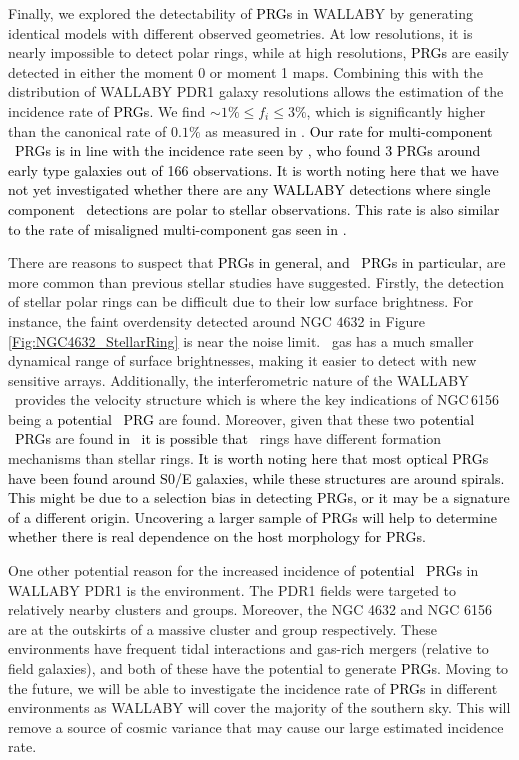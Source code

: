 \documentclass[fleqn,usenatbib]{mnras}
\newcommand{\hi}{\text{H\,\sc{i}}}
\begin{document}
Finally, we explored the detectability of \textcolor{black}{PRGs} in WALLABY by generating identical models with different observed geometries.  At low resolutions, it is nearly impossible to detect polar rings, while at high resolutions, \textcolor{black}{PRGs} are easily detected in either the moment 0 or moment 1 maps.  Combining this with the distribution of WALLABY PDR1 galaxy resolutions allows the estimation of the incidence rate of \textcolor{black}{PRGs}.  We find $\sim 1\% \le f_{i} \le 3 \%$, which is significantly higher than the canonical rate of $0.1\%$ as measured in \citet{Reshetnikov2011}.  \textcolor{black}{Our rate for multi-component \hi\ PRGs is in line with the incidence rate seen by \citet{Serra2012}, who found 3 PRGs around early type galaxies out of 166 observations.  It is worth noting here that we have not yet investigated whether there are any WALLABY detections where single component \hi\ detections are polar to stellar observations.  This rate is also similar to the rate of misaligned multi-component gas seen in \citet{Cao2022}.}

There are reasons to suspect that \textcolor{black}{PRGs} \textcolor{black}{in general, and \hi\ PRGs in particular,} are more common than previous stellar studies have suggested.  Firstly, the detection of stellar polar rings can be difficult due to their low surface brightness.  For instance, the faint overdensity detected around NGC 4632 in Figure \ref{Fig:NGC4632_StellarRing} is near the noise limit.  \hi\ gas has a much smaller dynamical range of surface brightnesses, making it easier to detect with new sensitive arrays.  Additionally, the interferometric nature of the WALLABY \hi\
provides the velocity structure which is where the key indications of NGC\,6156 being a \textcolor{black}{potential \hi\ PRG} are found.  Moreover, given that these two \textcolor{black}{potential \hi\ PRGs} are found \textcolor{black}{in \hi\, it is possible that} \hi\ rings have different formation mechanisms than stellar rings.  \textcolor{black}{It is worth noting here that most optical PRGs have been found around S0/E galaxies, while these structures are around spirals.  This might be due to a selection bias in detecting PRGs, or it may be a signature of a different origin.  Uncovering a larger sample of PRGs will help to determine whether there is real dependence on the host morphology for PRGs.}

One other potential reason for the increased incidence of \textcolor{black}{potential \hi\ PRGs} in WALLABY PDR1 is the environment.  The PDR1 fields were targeted to relatively nearby clusters and groups. Moreover, the NGC 4632 and NGC 6156 are at the outskirts of a massive  cluster and group respectively.  These environments have frequent tidal interactions and gas-rich mergers (relative to field galaxies), and both of these have the potential to generate \textcolor{black}{PRGs}.  Moving to the future, we will be able to investigate the incidence rate of \textcolor{black}{PRGs} in different environments as WALLABY will cover the majority of the southern sky.  This will remove a source of cosmic variance that may cause our large estimated incidence rate.
\end{document}
